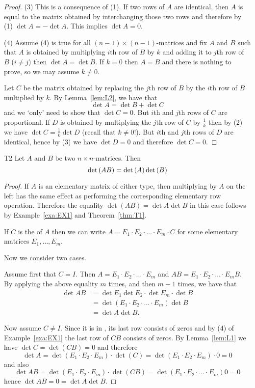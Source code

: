 \begin{proof}
(3) This is a consequence of (1). If two rows of $A$ are identical, then 
$A$ is equal to the matrix obtained by interchanging those two rows and 
therefore by (1) $\det A=-\det A$. This implies $\det A=0$. 

(4) Assume (4) is true for all $(n-1)\times (n-1)$-matrices
and fix $A$ and $B$ such that
 $A$ is obtained by multiplying $i$th row of $B$ by $k$ and adding it to 
$j$th row of $B$ ($i\neq j$) then $\det A=\det B$. 
If $k=0$ then $A=B$ and there is nothing to prove, so we may assume $k\neq 0$. 

Let $C$ be the matrix obtained by replacing the $j$th row of $B$ by the $i$th row of $B$ 
multiplied by $k$. 
By Lemma~\ref{lem:L2}, we have that 
\[
\det A=\det B+\det C
\]
and we `only' need to show that $\det C=0$. But $i$th and $j$th rows of $C$
are proportional. If $D$ is obtained by multiplying the $j$th row of $C$ by $\frac 1k$
then  by (2) we have $\det C=\frac 1k\det D$ (recall that $k\neq 0$!). 
But $i$th and $j$th rows of $D$ are identical, hence by (3) we have $\det D=0$
and therefore $\det C=0$. 
\end{proof} 

\begin{theorem}{}{T2}
Let $A$ and $B$ be two $n\times n$-matrices. Then
\begin{equation*}
\det \left(AB\right) =\det \left(A\right) \det \left(B\right)
\end{equation*}
\end{theorem}

\begin{proof} If $A$ is an elementary matrix of either type, then multiplying
by $A$ on the left has the same effect as performing the corresponding elementary 
row operation. Therefore the equality $\det (AB) =\det A\det B$  in this case follows by Example~\ref{exa:EX1} 
and Theorem~\ref{thm:T1}. 

If $C$ is the {\rref} of $A$ then we can write $A=E_1\cdot E_2\cdot\dots\cdot E_m\cdot C$
for some elementary matrices $E_1,\dots, E_m$. 

Now we consider two cases. 

Assume first that  $C=I$. Then $A=E_1\cdot E_2\cdot \dots\cdot E_m$ 
and $AB= E_1\cdot E_2\cdot \dots\cdot E_m B$. 
    By applying the above equality $m$ times, and then $m-1$ times,   
we have that 
\begin{align*}
\det AB&=\det E_1\det E_2\cdot \det E_m\cdot \det B\\
&=\det (E_1\cdot E_2\cdot\dots\cdot E_m) \det B\\
&=\det A\det B. 
\end{align*} 

Now assume $C\neq I$. Since it is in {\rref}, its last row consists of zeros 
and by (4) of Example~\ref{exa:EX1} the last row of $CB$ consists of zeros. 
By Lemma~\ref{lem:L1} we have $\det C=\det (CB)=0$ and therefore 
\[
\det A=\det (E_1\cdot E_2\cdot  E_m)\cdot  \det (C)
=
\det (E_1\cdot E_2\cdot  E_m)\cdot 0=0
\]
and also 
\[
\det AB=\det (E_1\cdot E_2\cdot  E_m)\cdot  \det (C B)
=\det (E_1\cdot E_2\cdot\dots\cdot E_m) 0
=0
\]
hence $\det AB=0=\det A \det B$. 
\end{proof} 

